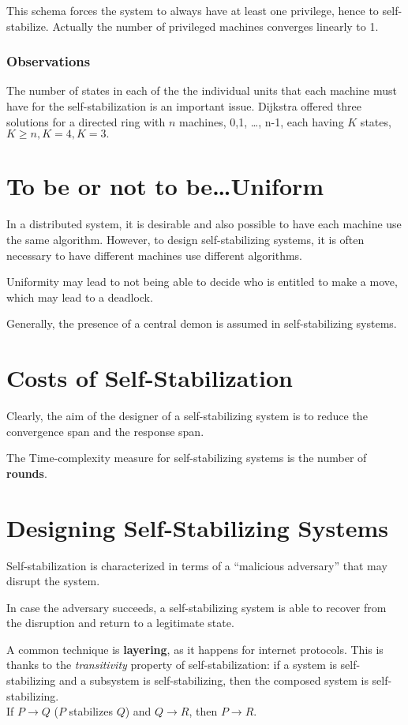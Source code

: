 This schema forces the system to always have at least one privilege, hence to self-stabilize.
Actually the number of privileged machines converges linearly to 1.


\subsubsection{Observations}

The number of states in each of the the individual units that each machine must have for the self-stabilization is an important issue. Dijkstra offered three solutions for a directed ring with $n$ machines, 0,1, \dots, n-1, each having $K$ states, $K \geq n, K=4, K=3.$


\section{To be or not to be\dots Uniform}
In a distributed system, it is desirable and also possible to have each machine use the same algorithm.
However, to design self-stabilizing systems, it is often necessary to have different machines use different algorithms.

Uniformity may lead to not being able to decide who is entitled to make a move, which may lead to a deadlock.
\nl

Generally, the presence of a central demon is assumed in self-stabilizing systems.



\section{Costs of Self-Stabilization}
Clearly, the aim of the designer of a self-stabilizing system is to reduce the convergence span and the response span.

The Time-complexity measure for self-stabilizing systems is the number of \textbf{rounds}.


\section{Designing Self-Stabilizing Systems}
Self-stabilization is characterized in terms of a ``malicious adversary''  that may disrupt the system.

In case the adversary succeeds, a self-stabilizing system is able to recover from the disruption and return to a legitimate state.
\nl


A common technique is \textbf{layering}, as it happens for internet protocols.
This is thanks to the \textit{transitivity} property of self-stabilization: if a system is self-stabilizing and a subsystem is self-stabilizing, then the composed system is self-stabilizing.\\
If $P \rightarrow Q$ ($P$ stabilizes $Q$) and $Q \rightarrow R$, then $P \rightarrow R$.

